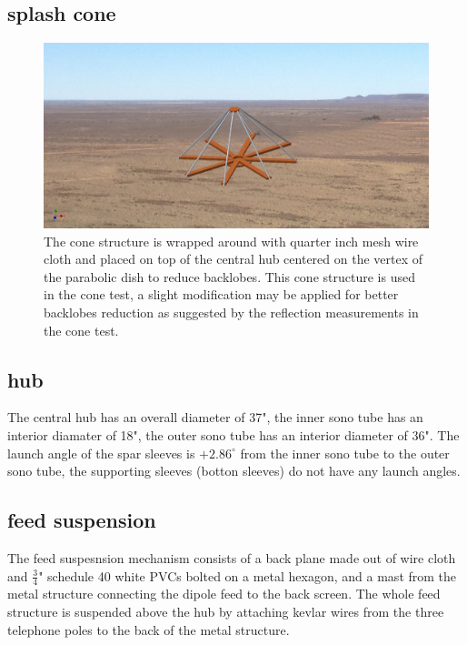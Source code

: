 \documentclass[preprint]{aastex}  %
\begin{document}
\subsection{splash cone}
\begin{figure}[H]
	\begin{center}
	\includegraphics[width =\textwidth]{./dish_plots/splashAssembly}
	\caption{The cone structure is wrapped around with quarter inch mesh wire cloth and placed on top of the central hub centered on the vertex of the parabolic dish to reduce backlobes. This cone structure is used in the cone test, a slight modification may be applied for better backlobes reduction as suggested by the reflection measurements in the cone test. 
\label{Fig:splashcone} }
	\end{center}
\end{figure}

\subsection{hub}
The central hub has an overall diameter of 37", the inner sono tube has an interior diamater of 18", the outer sono tube has an interior diameter of 36". The launch angle of the spar sleeves is $+2.86^{\circ}$ from the inner sono tube to the outer sono tube, the supporting sleeves (botton sleeves) do not have any launch angles.


\subsection {feed suspension}
The feed suspesnsion mechanism consists of a back plane made out of wire cloth and $\frac{3}{4}$" schedule 40 white PVCs bolted on a metal hexagon, and a mast from the metal structure connecting the dipole feed to the back screen. The whole feed structure is suspended above the hub by attaching kevlar wires from the three telephone poles to the back of the metal structure. 
\end{document}
